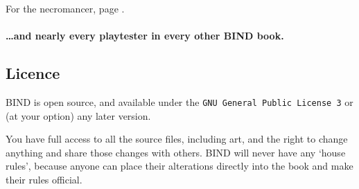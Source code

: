 \begin{multicols}{2}
For the necromancer, page \pageref{Decky/necromancer}.

\paragraph{\ldots and nearly every playtester in every other BIND book.}

\subsection*{Licence}

BIND is open source, and available under the {\tt GNU General Public License 3} or (at your option) any later version.

You have full access to all the source files, including art, and the right to change anything and share those changes with others.
BIND will never have any `house rules', because anyone can place their alterations directly into the book and make their rules official.

\end{multicols}
